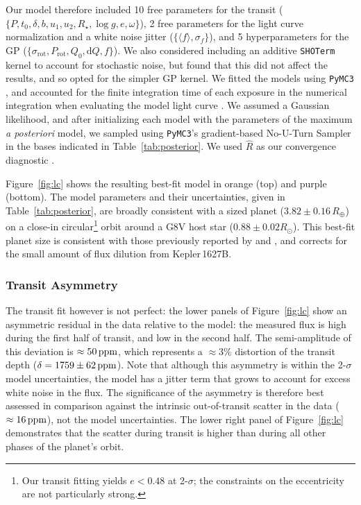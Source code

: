 \documentclass[12pt,modern,twocolumn,tighten,linenumbers]{aastex63}
\begin{document}
Our model therefore included 10 free parameters for the transit ($\{P,
t_0, \delta, b, u_1 ,u_2 ,R_\star, \log g, e, \omega \}$), 2 free
parameters for the light curve normalization and a white noise jitter
($\{\langle f \rangle, \sigma_f \}$), and 5 hyperparameters for the GP
($\{\sigma_{\mathrm{rot}}, P_{\mathrm{rot}}, Q_0, \mathrm{d}Q, f \}$).
We also considered including an additive \texttt{SHOTerm} kernel to
account for stochastic noise, but found that this did not affect the
results, and so opted for the simpler GP kernel.  We fitted the models
using \texttt{PyMC3} \citep{salvatier_2016_PyMC3,exoplanet:theano},
and accounted for the finite integration time of each exposure in the
numerical integration when evaluating the model light curve
\citep[see][]{kipping_binning_2010}.  We assumed a Gaussian
likelihood, and after initializing each model with the parameters of
the maximum {\it a posteriori} model, we sampled using
\texttt{PyMC3}'s gradient-based No-U-Turn Sampler
\citep{hoffman_no-u-turn_2014} in the bases indicated in
Table~\ref{tab:posterior}.  We used $\hat{R}$ as our convergence
diagnostic \citep{gelman_inference_1992}.

Figure~\ref{fig:lc} shows the resulting best-fit model in orange (top)
and purple (bottom).  The model parameters and their uncertainties,
given in Table~\ref{tab:posterior}, are broadly consistent with a
sized planet ($3.82\pm0.16\,R_\oplus$) on a close-in
circular\footnote{ Our transit fitting yields $e<0.48$ at 2-$\sigma$;
the constraints on the eccentricity are not particularly strong.}
orbit around a G8V host star ($0.88 \pm 0.02 R_\odot$).  This best-fit
planet size is consistent with those previously reported by
\citet{morton_false_2016} and \citet{berger_2018_radii}, and
corrects for the small amount of flux dilution from Kepler\,1627B.

\subsubsection{Transit Asymmetry}
\label{subsec:asymmetry}
The transit fit however is not perfect: the lower panels of
Figure~\ref{fig:lc} show an asymmetric residual in the data relative
to the model: the measured flux is high during the first half of
transit, and low in the second half.  The semi-amplitude of this
deviation is $\approx50\,{\rm ppm}$, which represents a $\approx 3\%$
distortion of the transit depth ($\delta=1759\pm62\,{\rm ppm}$).  Note that
although this asymmetry is within the 2-$\sigma$ model uncertainties, the
model has a jitter term that grows to account for excess
white noise in the flux.  The significance of the asymmetry is
therefore best assessed in comparison against the intrinsic
out-of-transit scatter in the data ($\approx16\,{\rm ppm}$), not the model uncertainties.  The
lower right panel of Figure~\ref{fig:lc} demonstrates that the scatter during
transit is higher than during all other phases of the planet's orbit.
\end{document}
